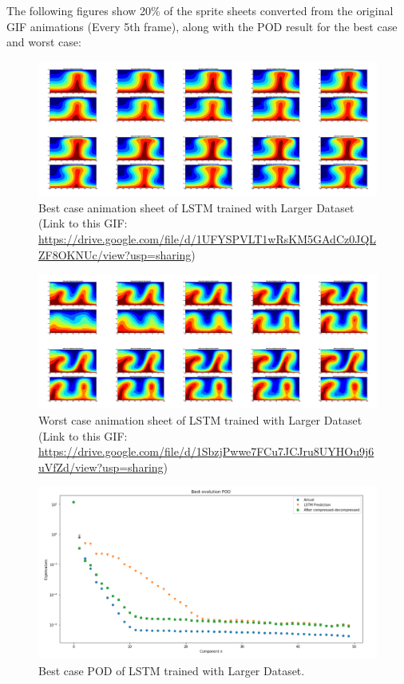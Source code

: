 The following figures show 20\% of the sprite sheets converted from the original GIF animations (Every 5th frame), along with the POD result for the best case and worst case:

\begin{figure}[H]
    \centering
    \caption{Best case animation sheet of LSTM trained with Larger Dataset (Link to this GIF: \url{https://drive.google.com/file/d/1UFYSPVLT1wRsKM5GAdCz0JQLZF8OKNUc/view?usp=sharing})}
    \includegraphics[scale=0.10]{figures/mantle_convection_images/larger_dataset/LSTM_Best_GIF_sheet.png}
\end{figure}



\begin{figure}[H]
    \centering
    \caption{Worst case animation sheet of LSTM trained with Larger Dataset (Link to this GIF: 
    \url{https://drive.google.com/file/d/1SbzjPwwe7FCu7JCJru8UYHOu9j6uVfZd/view?usp=sharing})}
    \includegraphics[scale=0.10]{figures/mantle_convection_images/larger_dataset/LSTM_Worst_GIF_sheet.png}
\end{figure}


\begin{figure}[H]
    \caption{Best case POD of LSTM trained with Larger Dataset.}
    \includegraphics[scale=0.5]{figures/mantle_convection_images/larger_dataset/LSTM_Best_POD.png}
\end{figure}

